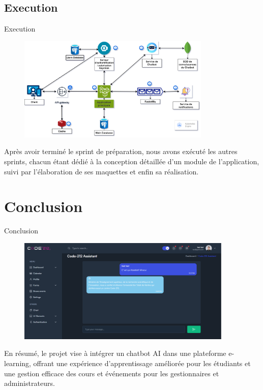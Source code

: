 \documentclass{beamer}
\begin{document}
\subsection{Execution}
\begin{frame}{Execution}
    \begin{figure}[htpb]
        \centering
        \includegraphics[height=5cm]{pic/Code212_architecture.drawio (1).png}
    \end{figure}

    Après avoir terminé le sprint de préparation, nous avons exécuté les autres sprints, chacun étant dédié à la conception détaillée d’un module de l’application, suivi par l’élaboration de ses maquettes et enfin sa réalisation.
\end{frame}

\section{Conclusion}

\begin{frame}{Conclusion}
    \begin{figure}[htpb]
        \centering
        \includegraphics[height=5cm]{pic/chat1.png}
    \end{figure}
    En résumé, le projet vise à intégrer un chatbot AI dans une plateforme e-learning, offrant une expérience d’apprentissage améliorée pour les étudiants et une gestion efficace des cours et événements pour les gestionnaires et administrateurs.
\end{frame}
\end{document}
